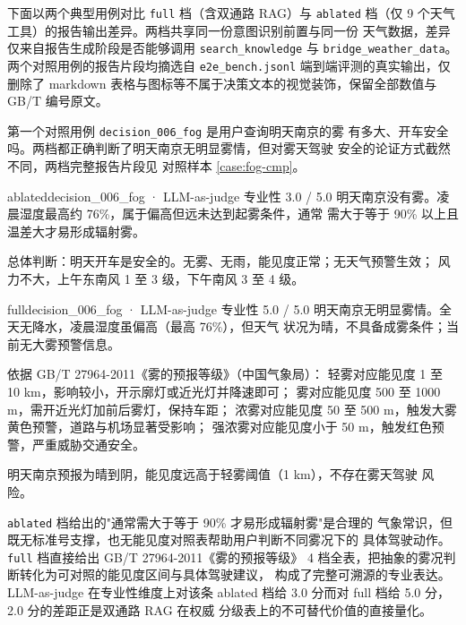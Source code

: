 \documentclass[a4paper]{article}
\theoremstyle{definition}
\theoremstyle{plain}
\theoremstyle{remark}
\newcommand{\refcase}[1]{对照样本 \ref{#1}}
\newcommand{\bk}{\discretionary{}{}{}}
\begin{document}
下面以两个典型用例对比 \texttt{full} 档（含双通路 RAG）与 \texttt{ablated}
档（仅 9 个天气工具）的报告输出差异。两档共享同一份意图识别前置与同一份
天气数据，差异仅来自报告生成阶段是否能够调用 \texttt{search\_\bk{}knowledge}
与 \texttt{bridge\_\bk{}weather\_\bk{}data}。两个对照用例的报告片段均摘选自
\texttt{e2e\_\bk{}bench.\bk{}jsonl} 端到端评测的真实输出，仅删除了 markdown
表格与图标等不属于决策文本的视觉装饰，保留全部数值与 GB/T 编号原文。

第一个对照用例 \texttt{decision\_\bk{}006\_\bk{}fog} 是用户查询明天南京的雾
有多大、开车安全吗。两档都正确判断了明天南京无明显雾情，但对雾天驾驶
安全的论证方式截然不同，两档完整报告片段见 \refcase{case:fog-cmp}。

\begin{casebox}
    \caption{\texttt{decision\_\bk{}006\_\bk{}fog} 用例 \texttt{ablated} 档与 \texttt{full} 档报告片段对照}
    \label{case:fog-cmp}
    \begin{reportsnippet}{ablated}{decision\_\bk{}006\_\bk{}fog · LLM-as-judge 专业性 3.0 / 5.0}
    明天南京没有雾。凌晨湿度最高约 76\%，属于偏高但远未达到起雾条件，通常
    需大于等于 90\% 以上且温差大才易形成辐射雾。

    总体判断：明天开车是安全的。无雾、无雨，能见度正常；无天气预警生效；
    风力不大，上午东南风 1 至 3 级，下午南风 3 至 4 级。
    \end{reportsnippet}

    \begin{reportsnippet}{full}{decision\_\bk{}006\_\bk{}fog · LLM-as-judge 专业性 5.0 / 5.0}
    明天南京无明显雾情。全天无降水，凌晨湿度虽偏高（最高 76\%），但天气
    状况为晴，不具备成雾条件；当前无大雾预警信息。

    依据 GB/T 27964-2011《雾的预报等级》（中国气象局）：
    轻雾对应能见度 1 至 10 km，影响较小，开示廓灯或近光灯并降速即可；
    雾对应能见度 500 至 1000 m，需开近光灯加前后雾灯，保持车距；
    浓雾对应能见度 50 至 500 m，触发大雾黄色预警，道路与机场显著受影响；
    强浓雾对应能见度小于 50 m，触发红色预警，严重威胁交通安全。

    明天南京预报为晴到阴，能见度远高于轻雾阈值（1 km），不存在雾天驾驶
    风险。
    \end{reportsnippet}
\end{casebox}

\texttt{ablated} 档给出的"通常需大于等于 90\% 才易形成辐射雾"是合理的
气象常识，但既无标准号支撑，也无能见度对照表帮助用户判断不同雾况下的
具体驾驶动作。\texttt{full} 档直接给出 GB/T 27964-2011《雾的预报等级》
4 档全表，把抽象的雾况判断转化为可对照的能见度区间与具体驾驶建议，
构成了完整可溯源的专业表达。LLM-as-judge 在专业性维度上对该条 ablated
档给 3.0 分而对 full 档给 5.0 分，2.0 分的差距正是双通路 RAG 在权威
分级表上的不可替代价值的直接量化。
\end{document}
